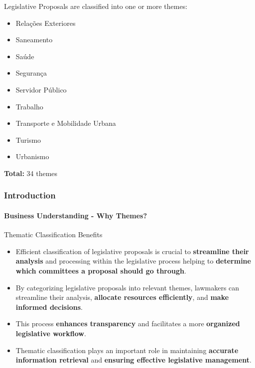 \begin{frame}
\begin{exampleblock}{Legislative Proposals are classified into one or more themes:}
\begin{multicols}{3}
\begin{itemize}
				\item Relações Exteriores
				\item Saneamento
				\item Saúde
				\item Segurança
				\item Servidor Público
				\item Trabalho
				\item Transporte e Mobilidade Urbana
				\item Turismo
				\item Urbanismo
				\normalsize
			\end{itemize}
		\end{multicols}
		\textbf{Total:} 34 themes	
	\end{exampleblock}
\end{frame}
\begin{frame}
	\frametitle{Introduction}
	\framesubtitle{Business Understanding - Why Themes?}
	\begin{block}{Thematic Classification Benefits} %
		\begin{itemize}
			\item Efficient classification of legislative proposals is crucial to \textbf{streamline their analysis} and processing within the legislative process helping to \textbf{determine which committees a proposal should go through}.
					
							

			\item By categorizing legislative proposals into relevant themes, lawmakers can streamline their analysis, \textbf{allocate resources efficiently}, and \textbf{make informed decisions}. 

			\item This process \textbf{enhances transparency} and facilitates a more \textbf{organized legislative workflow}.	

					
			\item Thematic classification plays an important role in maintaining \textbf{accurate information retrieval} and \textbf{ensuring effective legislative management}.
			
				
		\end{itemize}
	\end{block}
\end{frame}
